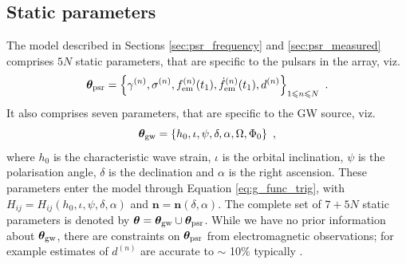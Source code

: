 \documentclass[fleqn,usenatbib,useAMS]{mnras}
\begin{document}
\subsection{Static parameters}\label{sec:ss_params}
The model described in Sections \ref{sec:psr_frequency} and \ref{sec:psr_measured} comprises $5N$ static parameters, that are specific to the pulsars in the array, viz.
\begin{equation}
	\boldsymbol{\theta}_{\rm psr} = \left \{ \gamma^{(n)},\sigma^{(n)}, f_{\rm em}^{(n)}(t_1),\dot{f}_{\rm em}^{(n)}(t_1),d^{(n)}\right\}_{1\leq n \leq N} \ .  \label{eq:psrparams}
\end{equation}
It also comprises seven parameters, that are specific to the GW source, viz. 
\begin{equation}
	\boldsymbol{\theta}_{\rm gw} = \left \{h_0, \iota, \psi, \delta, \alpha, \Omega, \Phi_0 \right \} \ ,  \label{eq:params3}
\end{equation}
where $h_0$ is the characteristic wave strain, $\iota$ is the orbital inclination, $\psi$ is the polarisation angle, $\delta$ is the declination and $\alpha$ is the right ascension. These parameters enter the model through Equation \eqref{eq:g_func_trig}, with $H_{ij} = H_{ij}(h_0, \iota, \psi, \delta, \alpha)$ and $\boldsymbol{n}=\boldsymbol{n}(\delta,\alpha)$. The complete set of $7 + 5N$ static parameters is denoted by $\boldsymbol{\theta} = \boldsymbol{\theta}_{\rm gw} \cup \boldsymbol{\theta}_{\rm psr}$. While we have no prior information about $\boldsymbol{\theta}_{\rm gw}$, there are constraints on $\boldsymbol{\theta}_{\rm psr}$ from electromagnetic observations; for example estimates of $d^{(n)}$ are accurate to $\sim$ 10$\%$ typically \citep{Cordes2002astro.ph..7156C, Verbiest2012ApJ...755...39V, Desvignes2016,Yao2017}.
\end{document}
